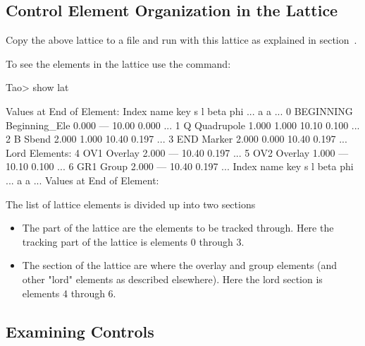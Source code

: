 \documentclass{hitec}
\begin{document}
\subsection{Control Element Organization in the Lattice}

Copy the above lattice to a file and run \tao with this lattice as explained in
section~.

To see the elements in the lattice use the  command:
{\small
\begin{code}
Tao> show lat

      Values at End of Element:
 Index  name      key                       s       l    beta     phi ...
                                                            a       a ...
     0  BEGINNING Beginning_Ele         0.000     ---   10.00   0.000 ...
     1  Q         Quadrupole            1.000   1.000   10.10   0.100 ...
     2  B         Sbend                 2.000   1.000   10.40   0.197 ...
     3  END       Marker                2.000   0.000   10.40   0.197 ...
Lord Elements:
     4  OV1       Overlay               2.000     ---   10.40   0.197 ...
     5  OV2       Overlay               1.000     ---   10.10   0.100 ...
     6  GR1       Group                 2.000     ---   10.40   0.197 ...
 Index  name      key                       s       l    beta     phi ...
                                                            a       a ...
      Values at End of Element:
\end{code}}

The list of lattice elements is divided up into two sections
\begin{itemize}
\item
The  part of the lattice are the elements to be tracked through. Here the tracking part of
the lattice is elements 0 through 3.
\item
The  section of the lattice are where the overlay and group elements (and other "lord"
elements as described elsewhere). Here the lord section is elements 4 through 6.
\end{itemize}

\subsection{Examining Controls}
\end{document}

